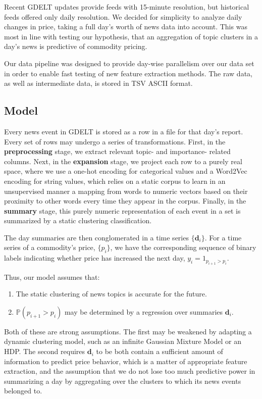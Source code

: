 Recent GDELT updates provide feeds with 15-minute resolution, but historical feeds offered only daily resolution. We decided for simplicity to analyze daily changes in price, taking a full day's worth of news data into account. This was most in line with testing our hypothesis, that an aggregation of topic clusters in a day's news is predictive of commodity pricing.

Our data pipeline was designed to provide day-wise parallelism over our data set in order to enable fast testing of new feature extraction methods. The raw data, as well as intermediate data, is stored in TSV ASCII format.

\subsection{Model}

Every news event in GDELT is stored as a row in a file for that day's report. Every set of rows may undergo a series of transformations. First, in the \textbf{preprocessing} stage, we extract relevant topic- and importance- related columns. Next, in the \textbf{expansion} stage, we project each row to a purely real space, where we use a one-hot encoding for categorical values and a Word2Vec encoding for string values, which relies on a static corpus to learn in an unsupervised manner a mapping from words to numeric vectors based on their proximity to other words every time they appear in the corpus. Finally, in the \textbf{summary} stage, this purely numeric representation of each event in a set is summarized by a static clustering classification.

The day summaries are then conglomerated in a time series $\{\textbf{d}_i\}$. For a time series of a commodity's price, $\{p_i\}$, we have the corresponding sequence of binary labels indicating whether price has increased the next day, $y_i=1_{p_{i+1}>p_i}$.

Thus, our model assumes that:
\begin{enumerate}
\item The static clustering of news topics is accurate for the future.
\item $\mathbb{P}(p_{i+1}>p_i)$ may be determined by a regression over summaries $\textbf{d}_i$. 
\end{enumerate}

Both of these are strong assumptions. The first may be weakened by adapting a dynamic clustering model, such as an infinite Gaussian Mixture Model or an HDP. The second requires $\textbf{d}_i$ to be both contain a sufficient amount of information to predict price behavior, which is a matter of appropriate feature extraction, and the assumption that we do not lose too much predictive power in summarizing a day by aggregating over the clusters to which its news events belonged to.


